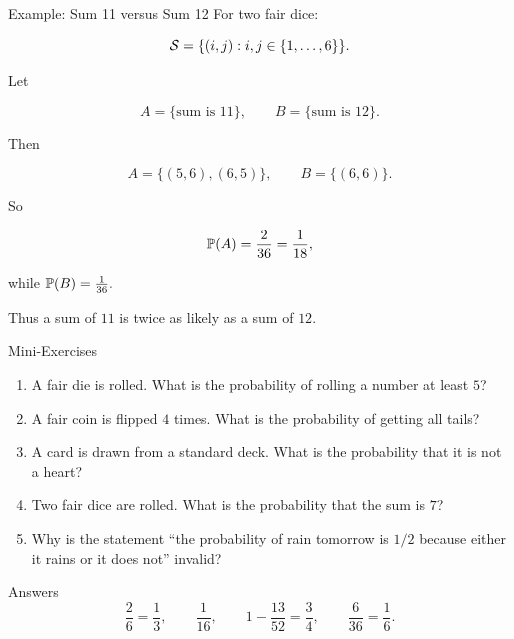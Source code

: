 \begin{frame}{Example: Sum 11 versus Sum 12}
For two fair dice:

\[
\mathcal{S} = \{(i,j): i,j \in \{1,\dots,6\}\}.
\]

Let

\[
A = \{\text{sum is } 11\},
\qquad
B = \{\text{sum is } 12\}.
\]

Then

\[
A = \{(5,6),(6,5)\},
\qquad
B = \{(6,6)\}.
\]

So

\[
\mathbb{P}(A)=\frac{2}{36}=\frac{1}{18},
\]

while $\mathbb{P}(B)=\frac{1}{36}.$

Thus a sum of $11$ is twice as likely as a sum of $12$.
\end{frame}


\begin{frame}{Mini-Exercises}
\begin{enumerate}
    \item A fair die is rolled. What is the probability of rolling a number at least $5$?

    \item A fair coin is flipped $4$ times. What is the probability of getting all tails?

    \item A card is drawn from a standard deck. What is the probability that it is not a heart?

    \item Two fair dice are rolled. What is the probability that the sum is $7$?

    \item Why is the statement ``the probability of rain tomorrow is $1/2$ because either it rains or it does not'' invalid?
\end{enumerate}

\vspace{0.2cm}

\begin{livebox}{Answers}
\[
\frac{2}{6}=\frac13,
\qquad
\frac{1}{16},
\qquad
1-\frac{13}{52}=\frac34,
\qquad
\frac{6}{36}=\frac16.
\]
\end{livebox}
\end{frame}

